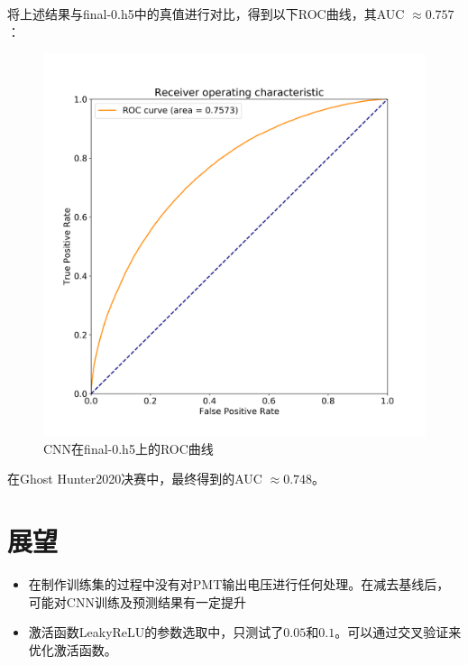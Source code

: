 \documentclass{ctexart}
\begin{document}
将上述结果与final-0.h5中的真值进行对比，得到以下ROC曲线，其AUC $\approx0.757$：
\begin{figure}[H]
    \centering
    \includegraphics[width=1.0\linewidth]{ROC.png}
    \caption{CNN在final-0.h5上的ROC曲线}
\end{figure}

在Ghost Hunter2020决赛中，最终得到的AUC $\approx0.748$。

\section{展望}
\begin{itemize}
    \item 在制作训练集的过程中没有对PMT输出电压进行任何处理。在减去基线后，可能对CNN训练及预测结果有一定提升
    \item 激活函数LeakyReLU的参数选取中，只测试了$0.05$和$0.1$。可以通过交叉验证来优化激活函数。
\end{itemize}

% 
\end{document}
